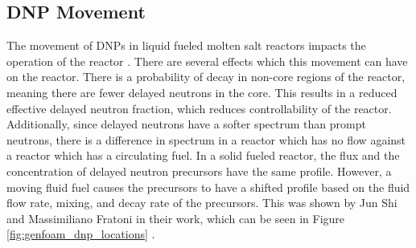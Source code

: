 \subsection{DNP Movement}

The movement of DNPs in liquid fueled molten salt reactors impacts the operation of the reactor \cite{wooten_review_2018, aufiero_calculating_2014}. %
There are several effects which this movement can have on the reactor. %
There is a probability of decay in non-core regions of the reactor, meaning there are fewer delayed neutrons in the core. This results in a reduced effective delayed neutron fraction, which reduces controllability of the reactor. Additionally, since delayed neutrons have a softer spectrum than prompt neutrons, there is a difference in spectrum in a reactor which has no flow against a reactor which has a circulating fuel.
In a solid fueled reactor, the flux and the concentration of delayed neutron precursors have the same profile. However, a moving fluid fuel causes the precursors to have a shifted profile based on the fluid flow rate, mixing, and decay rate of the precursors. This was shown by Jun Shi and Massimiliano Fratoni in their work, which can be seen in Figure \ref{fig:genfoam_dnp_locations} \cite{shi_gen-foam_2021}.


